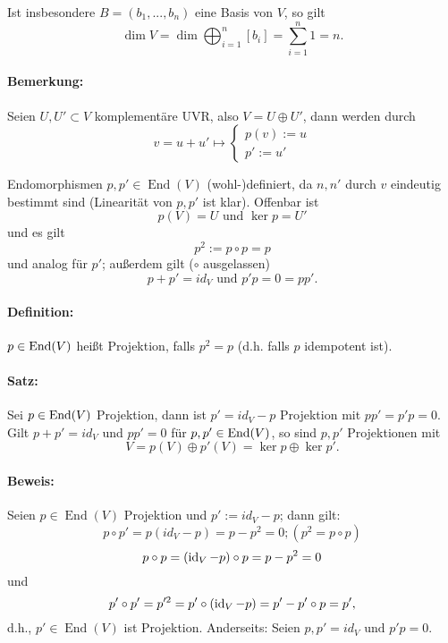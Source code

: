 	Ist insbesondere $ B=(b_1,...,b_n) $ eine Basis von $ V $, so gilt
		\begin{equation*}
		\dim V = \dim \bigoplus_{i=1}^n [b_i]=\sum_{i=1}^{n}1 = n.
		\end{equation*}
\paragraph{Bemerkung: }
	Seien $ U,U'\subset V $ komplementäre UVR, also $ V = U \oplus U' $, dann werden durch
		\begin{equation*}
		v = u+u' \mapsto
			\begin{cases}
				p(v):=u\\
				p':= u'
			\end{cases}
		\end{equation*}
	
	Endomorphismen $ p,p'\in \operatorname{End}(V) $ (wohl-)definiert, da $ n,n' $ durch $ v $ eindeutig bestimmt sind (Linearität von $ p,p' $ ist klar).
	Offenbar ist 
		\[ p(V) = U \text{ und } \ker p = U'\]
	und es gilt
		\[ p^2 := p\circ p = p \]
	und analog für $ p' $; außerdem gilt ($ \circ $ ausgelassen)
		\[ p+p' = id_V \text{ und } p'p = 0 = pp'.\]
		
\paragraph{Definition: }
	$ p\in \operatorname{End}(V) $ heißt Projektion, falls $ p^2 = p $ (d.h. falls $ p $ idempotent ist).
	
\paragraph{Satz: }
	Sei $ p\in \operatorname{End}(V) $ Projektion, dann ist $ p'= id_V-p $ Projektion mit $ pp' = p'p = 0 $. Gilt $ p+p' = id_V $ und $ pp' = 0 $ für $ p,p' \in \operatorname{End}(V) $, so sind $ p,p' $ Projektionen mit
		\[ V = p(V)\oplus p'(V) = \ker p \oplus \ker p'. \]

\paragraph{Beweis: }
	Seien $p\in \operatorname{End}(V)$ Projektion und $p' := id_V -p$; dann gilt:
		\[p\circ p' = p(id_V-p)=p-p^{2} = 0; (p^{2} = p\circ p)\]
		\[p\circ p = (\operatorname{id}_V-p)\circ p = p - p^{2} = 0\]
	und
		\[p' \circ p' = p'^2 = p' \circ(\operatorname{id}_V-p)=p'-p'\circ p = p',\]
	d.h., $p'\in\operatorname{End}(V)$ ist Projektion.
	Anderseits: Seien $p,p' = id_V \text{ und } p' p = 0$.
		
